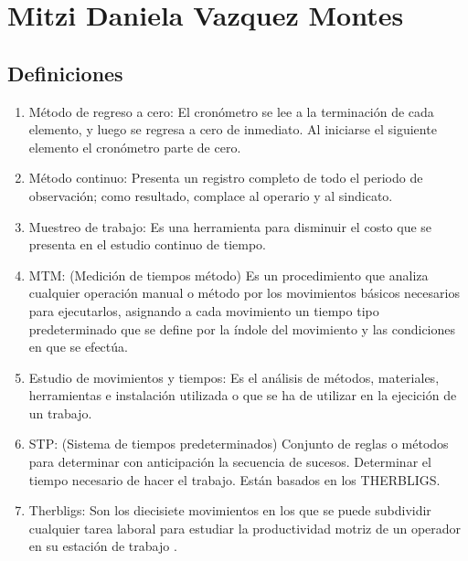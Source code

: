 \section{Mitzi Daniela Vazquez Montes}
\subsection{Definiciones}
\begin{enumerate}
    \item Método de regreso a cero: El cronómetro se lee a la terminación de cada elemento, y luego se regresa a cero de inmediato. Al iniciarse el siguiente elemento el cronómetro parte de cero.
    \item Método continuo: Presenta un registro completo de todo el periodo de observación; como resultado, complace al operario y al sindicato.
    \item Muestreo de trabajo: Es una herramienta para disminuir el costo que se presenta en el estudio continuo de tiempo.
    \item MTM: (Medición de tiempos método) Es un procedimiento que analiza cualquier operación manual o método por los movimientos básicos necesarios para ejecutarlos, asignando a cada movimiento un tiempo tipo predeterminado que se define por la índole del movimiento y las condiciones en que se efectúa.
    \item Estudio de movimientos y tiempos: Es el análisis de métodos, materiales, herramientas e instalación utilizada o que se ha de utilizar en la ejecición de un trabajo.
    \item STP: (Sistema de tiempos predeterminados) Conjunto de reglas o métodos para determinar con anticipación la secuencia de sucesos. Determinar el tiempo necesario de hacer el trabajo. Están basados en los THERBLIGS.
    \item Therbligs: Son los diecisiete movimientos en los que se puede subdividir cualquier tarea laboral para estudiar la productividad motriz de un operador en su estación de trabajo \cite{book}.
\end{enumerate}

